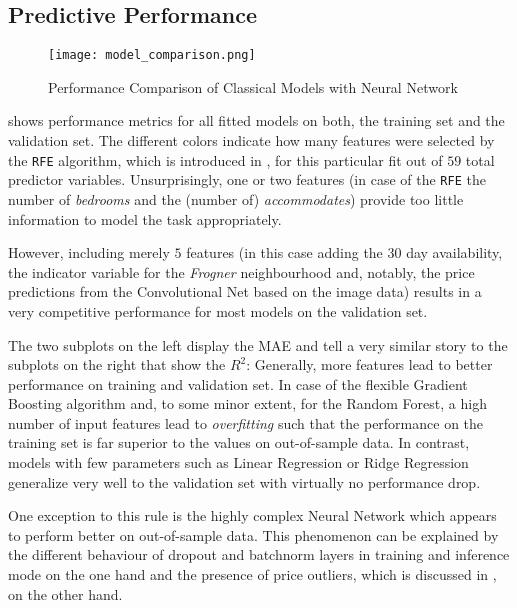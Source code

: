 \subsection{Predictive Performance}

\begin{figure}[t]
  \centering
  \texttt{[image: model\_comparison.png]}
  \caption{Performance Comparison of Classical Models with Neural Network}
  \label{fig:model-comparison}
\end{figure}

 shows performance metrics for all fitted models on both, the training set and the validation set.
The different colors indicate how many features were selected by the \texttt{RFE} algorithm, which is introduced in , for this particular fit out of $59$ total predictor variables.
Unsurprisingly, one or two features (in case of the \texttt{RFE} the number of \emph{bedrooms} and the (number of) \emph{accommodates}) provide too little information to model the task appropriately.

However, including merely $5$ features (in this case adding the $30$ day availability, the indicator variable for the \emph{Frogner} neighbourhood and, notably, the price predictions from the Convolutional Net based on the image data) results in a very competitive performance for most models on the validation set.

The two subplots on the left display the MAE and tell a very similar story to the subplots on the right that show the $R^2$:
Generally, more features lead to better performance on training and validation set.
In case of the flexible Gradient Boosting algorithm and, to some minor extent, for the Random Forest, a high number of input features lead to \emph{overfitting} such that the performance on the training set is far superior to the values on out-of-sample data.
In contrast, models with few parameters such as Linear Regression or Ridge Regression generalize very well to the validation set with virtually no performance drop.

One exception to this rule is the highly complex Neural Network which appears to perform better on out-of-sample data.
This phenomenon can be explained by the different behaviour of dropout and batchnorm layers in training and inference mode on the one hand and the presence of price outliers, which is discussed in , on the other hand.

